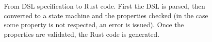 \begin{figure}
    \caption{
        From DSL specification to Rust code.
        First the DSL is parsed, then converted to a state machine and the properties checked
        (in the case some property is not respected, an error is issued).
        Once the properties are validated, the Rust code is generated.
    }
    \label{fig:dsl-processing}
\end{figure}